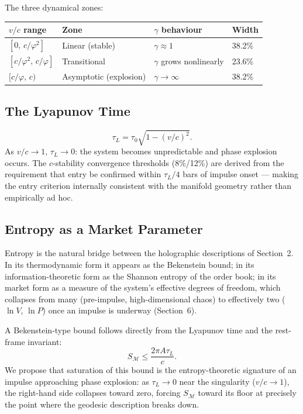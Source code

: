 \documentclass[12pt,a4paper]{article}
\begin{document}
The three dynamical zones:

\begin{center}
\begin{tabular}{llll}
\toprule
$v/c$ range & Zone & $\gamma$ behaviour & Width \\
\midrule
$[0,\,c/\varphi^2]$ & Linear (stable) & $\gamma\approx 1$ & 38.2\% \\
$[c/\varphi^2,\,c/\varphi]$ & Transitional & $\gamma$ grows nonlinearly & 23.6\% \\
$[c/\varphi,\,c)$ & Asymptotic (explosion) & $\gamma\to\infty$ & 38.2\% \\
\bottomrule
\end{tabular}
\end{center}

\subsection{The Lyapunov Time}
\begin{equation}
    \boxed{\tau_L = \tau_0\sqrt{1-(v/c)^2}}.
\end{equation}
As $v/c\to1$, $\tau_L\to0$: the system becomes unpredictable and phase
explosion occurs. The $c$-stability convergence thresholds (8\%/12\%) are
derived from the requirement that entry be confirmed within $\tau_L/4$
bars of impulse onset --- making the entry criterion internally consistent
with the manifold geometry rather than empirically ad hoc.

\subsection{Entropy as a Market Parameter}
\label{sec:entropy}

Entropy is the natural bridge between the holographic descriptions of
Section~2. In its thermodynamic form it appears as the Bekenstein bound;
in its information-theoretic form as the Shannon entropy of the order
book; in its market form as a measure of the system's effective degrees
of freedom, which collapses from many (pre-impulse, high-dimensional
chaos) to effectively two ($\ln V$, $\ln P$) once an impulse is
underway (Section~6).

A Bekenstein-type bound follows directly from the Lyapunov time and the
rest-frame invariant:
\begin{equation}
    \boxed{S_{\mathcal{M}} \leq \frac{2\pi A\tau_L}{c}.}
\end{equation}
We propose that saturation of this bound is the entropy-theoretic
signature of an impulse approaching phase explosion: as $\tau_L\to0$
near the singularity ($v/c\to1$), the right-hand side collapses toward
zero, forcing $S_{\mathcal{M}}$ toward its floor at precisely the point
where the geodesic description breaks down.
\end{document}
